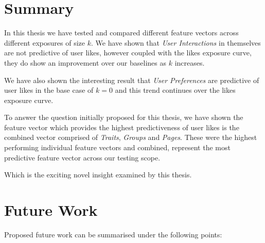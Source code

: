 

\section{Summary}
\label{sec:summary}

In this thesis we have tested and compared different feature vectors across different exposures of size $k$. 
We have shown that \emph{User Interactions} in themselves are not predictive of user likes, however coupled with the 
likes exposure curve, they do show an improvement over our baselines as $k$ increases.

We have also shown the interesting result that \emph{User Preferences} are predictive of user likes in the base case of $k = 0$ and 
this trend continues over the likes exposure curve.

To answer the question initially proposed for this thesis, we have shown the feature vector which provides the highest predictiveness 
of user likes is the combined vector comprised of \emph{Traits}, \emph{Groups} and \emph{Pages}. These were the highest performing 
individual feature vectors and combined, represent the most predictive feature vector across our testing scope.

Which is the exciting novel insight examined by this thesis.

\section{Future Work}
\label{sec:fw}

Proposed future work can be summarised under the following points:

